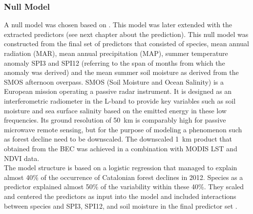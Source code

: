\subsubsection{Null Model}
A null model was chosen based on \citep{chaparro2017}. This model was later extended with the extracted predictors (see next chapter about the prediction). This null model was constructed from the final set of predictors that consisted of species, mean annual radiation (MAR), mean annual precipitation (MAP), summer temperature anomaly SPI3 and SPI12 (referring to the span of months from which the anomaly was derived) and the mean summer soil moisture as derived from the SMOS afternoon overpass. SMOS (Soil Moisture and Ocean Salinity) is a European mission operating a passive radar instrument. It is designed as an interferometric radiometer in the L-band \citep[f~=~1.4~GHz, $\lambda$ ~=~21~cm][]{kerr2001} to provide key variables such as soil moisture and sea surface salinity based on the emitted energy in these low frequencies. Its ground resolution of 50~km is comparably high for passive microwave remote sensing, but for the purpose of modeling a phenomenon such as forest decline need to be downscaled. The downscaled 1~km product that \cite{chaparro2017} obtained from the BEC \citep[Barcelona Expert Center][]{becsmos} was achieved in a combination with MODIS LST and NDVI data.\\
The model structure is based on a logistic regression that managed to explain almost 40\% of the occurrence of Catalonian forest declines in 2012. Species as a predictor explained almost 50\% of the variability within these 40\%. They scaled and centered the predictors as input into the model and included interactions between species and SPI3, SPI12, and soil moisture in the final predictor set \citep{chaparro2017}.\\


